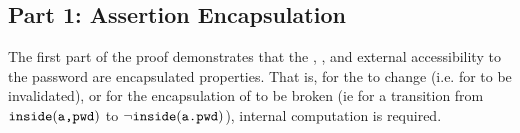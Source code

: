 

\subsection{Part 1: Assertion Encapsulation}
\label{s:BA-encap}
The first part of the proof demonstrates that the , , and external accessibility to the password are 
encapsulated properties. That is, for the  to change (i.e. for  to be invalidated),  
or for the encapsulation of  to be broken (ie for a transition from ${\texttt{inside}( {\texttt{a,pwd}} )}$ to $\neg {\texttt{inside}( {\texttt{a.pwd}} )}$),
internal computation is required. 

